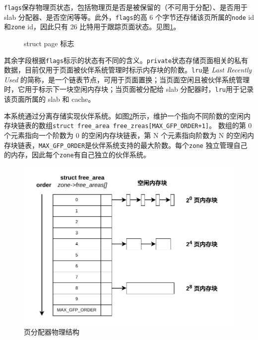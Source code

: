 \documentclass[AutoFakeBold]{LZUThesis}
\begin{document}
\begin{sloppypar}
\texttt{flags}保存物理页状态，包括物理页是否是被保留的（不可用于分配）、是否用于
slab 分配器、是否空闲等等。此外，\texttt{flags}的高 6
个字节还存储该页所属的\texttt{node} id 和\texttt{zone} id，因此只有 26
比特用于跟踪页面状态。见图\ref{fig:struct-page-flags}。

\begin{figure}[htb]
\centering

\caption{struct page 标志}
\label{fig:struct-page-flags}
\end{figure}

其余字段根据\texttt{flags}标示的状态有不同的含义。\texttt{private}状态存储页面相关的私有数据，目前仅用于页面被伙伴系统管理时标示内存块的阶数。\texttt{lru}是
\emph{Last Recently Used}
的简称，是一个链表节点，可用于页面置换；当页面空闲且被伙伴系统管理时，它用于标示下一块空闲内存块；当页面被分配给
slab 分配器时，\texttt{lru}用于记录该页面所属的 slab 和 cache。

本系统通过分离存储实现伙伴系统。如图\ref{figure:page-allocator-structure}所示，维护一个指向不同阶数的空闲内存块链表的数组\texttt{struct\ free\_area\ free\_zreas{[}MAX\_GFP\_ORDER+1{]}}。
数组的第 0 个元素指向一个阶数为 0 的空闲内存块链表，第 N
个元素指向阶数为 N
的空闲内存块链表，\texttt{MAX\_GFP\_ORDER}是伙伴系统支持的最大阶数。每个\texttt{zone}
独立管理自己的内存，因此每个\texttt{zone}有自己独立的伙伴系统。

\begin{figure}[htb]
\centering
\includegraphics[scale=0.6]{images/free-area.drawio.pdf}
\caption{页分配器物理结构}
\label{figure:page-allocator-structure}
\end{figure}


\end{sloppypar}
\end{document}
